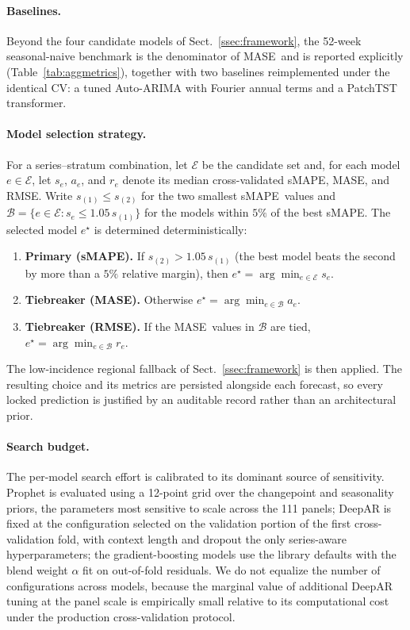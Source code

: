\documentclass[runningheads]{llncs}
\newcommand{\smape}{sMAPE}
\newcommand{\mase}{MASE}
\newcommand{\rmse}{RMSE}
\begin{document}
\paragraph{Baselines.}
Beyond the four candidate models of Sect.~\ref{ssec:framework}, the
52-week seasonal-naive benchmark is the denominator of \mase\ and is
reported explicitly (Table~\ref{tab:aggmetrics}), together with two
baselines reimplemented under the identical CV: a tuned Auto-ARIMA
with Fourier annual terms and a PatchTST transformer.

\paragraph{Model selection strategy.}
For a series--stratum combination, let $\mathcal{E}$ be the candidate
set and, for each model $e\in\mathcal{E}$, let $s_e$, $a_e$, and $r_e$
denote its median cross-validated \smape, \mase, and \rmse. Write
$s_{(1)}\le s_{(2)}$ for the two smallest \smape\ values and
$\mathcal{B}=\{e\in\mathcal{E}: s_e\le 1.05\,s_{(1)}\}$ for the models
within $5\%$ of the best \smape. The selected model $e^\star$ is determined
deterministically:
\begin{enumerate}
\item \textbf{Primary (\smape).} If $s_{(2)}>1.05\,s_{(1)}$ (the best
model beats the second by more than a $5\%$ relative margin), then
$e^\star=\arg\min_{e\in\mathcal{E}}s_e$.
\item \textbf{Tiebreaker (\mase).} Otherwise
$e^\star=\arg\min_{e\in\mathcal{B}}a_e$.
\item \textbf{Tiebreaker (\rmse).} If the \mase\ values in $\mathcal{B}$
are tied, $e^\star=\arg\min_{e\in\mathcal{B}}r_e$.
\end{enumerate}
The low-incidence regional fallback of Sect.~\ref{ssec:framework} is
then applied. The resulting choice and its metrics are persisted
alongside each forecast, so every locked prediction is justified by an
auditable record rather than an architectural prior.


\paragraph{Search budget.}
The per-model search effort is calibrated to its dominant source of
sensitivity. Prophet is evaluated using a 12-point grid over the
changepoint and seasonality priors, the parameters most sensitive to
scale across the 111 panels; DeepAR is fixed at the configuration
selected on the validation portion of the first cross-validation fold,
with context length and dropout the only series-aware hyperparameters;
the gradient-boosting models use the library defaults with the blend
weight $\alpha$ fit on out-of-fold residuals. We do not equalize the
number of configurations across models, because the marginal value of
additional DeepAR tuning at the panel scale is empirically small
relative to its computational cost under the production
cross-validation protocol.
\end{document}
